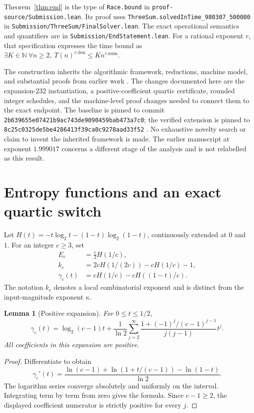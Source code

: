\documentclass[11pt,a4paper]{article}
\newtheorem{lemma}[theorem]{Lemma}
\newcommand{\N}{\mathbb{N}}
\newcommand{\code}[1]{\texttt{#1}}
\begin{document}
Theorem~\ref{thm:end} is the type of \code{Race.bound} in
\code{proof-source/Submission.lean}. Its proof uses
\code{ThreeSum.solvedInTime\_980307\_500000} in
\code{Submission/ThreeSum/FinalSolver.lean}. The exact operational
semantics and quantifiers are in \code{Submission/EndStatement.lean}.
For a rational exponent $r$, that specification expresses the time bound as
$\exists K\in\N\ \forall n\ge2,\ T(n)^{r.\mathrm{den}}
\le K n^{r.\mathrm{num}}$.

The construction inherits the algorithmic framework, reductions, machine
model, and substantial proofs from earlier work \cite{avw,base,anthropic}.
The changes documented here are the expansion-232 instantiation, a
positive-coefficient quartic certificate, rounded integer schedules,
and the machine-level proof changes needed to connect them to the exact
endpoint. The baseline is pinned to commit
\code{2b639655e07421b9ac743de9090459bab473a7c0}; the verified extension is
pinned to \code{8c25c0325de5be4286413f39ca0c9278aad33f52} \cite{artifact}.
No exhaustive novelty search or claim to invent the inherited framework
is made. The earlier manuscript at exponent $1.999017$ concerns a
different stage of the analysis and is not relabelled as this result.

\section{Entropy functions and an exact quartic switch}
Let $H(t)=-t\log_2t-(1-t)\log_2(1-t)$, continuously extended at
$0$ and $1$. For an integer $c\ge3$, set
\begin{align}
 E_c&=\tfrac c2 H(1/c),\\
 k_c&=2cH(1/(2c))-cH(1/c)-1,\\
 \gamma_c(t)&=cH(1/c)-cH((1-t)/c).
\end{align}
The notation $k_c$ denotes a local combinatorial exponent and is distinct
from the input-magnitude exponent $\kappa$.

\begin{lemma}[Positive expansion]\label{lem:series}
For $0\le t\le1/2$,
\[
 \gamma_c(t)=\log_2(c-1)t+
 \frac1{\ln2}\sum_{j=2}^{\infty}
 \frac{1+(-1)^j/(c-1)^{j-1}}{j(j-1)}t^j.
\]
All coefficients in this expansion are positive.
\end{lemma}
\begin{proof}
Differentiate to obtain
\[
 \gamma_c'(t)=\frac{\ln(c-1)+\ln(1+t/(c-1))-\ln(1-t)}{\ln2}.
\]
The logarithm series converge absolutely and uniformly on the interval.
Integrating term by term from zero gives the formula. Since $c-1\ge2$,
the displayed coefficient numerator is strictly positive for every $j$.
\end{proof}
\end{document}
